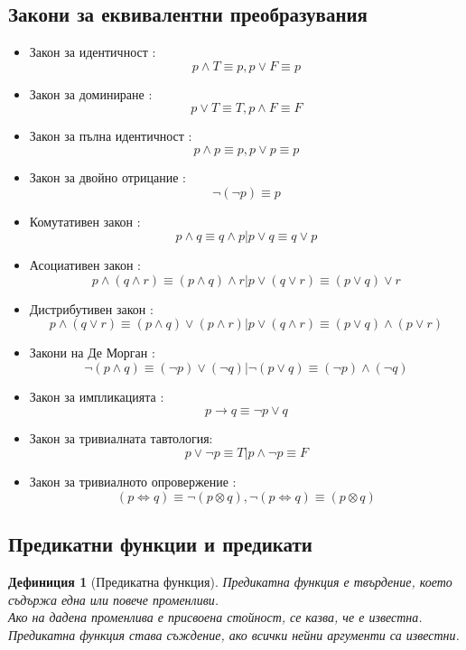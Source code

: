 \documentclass[fleqn, 12pt]{article}
\newtheorem{definition}{Дефиниция}[subsection]
\begin{document}
\newpage

\subsection{Закони за еквивалентни преобразувания}

\begin{itemize}
	\item Закон за идентичност : $$p \land T \equiv p , p \lor F \equiv p$$
	\item Закон за доминиране : $$p \lor T \equiv T , p \land F \equiv F$$
	\item Закон за пълна идентичност : $$p \land p \equiv p , p \lor p \equiv p$$
	\item Закон за двойно отрицание : $$\neg(\neg p) \equiv p $$
	\item Комутативен закон : $$p \land q \equiv q \land p | p \lor q \equiv q \lor p$$
	\item Асоциативен закон : $$p \land (q \land r) \equiv (p \land q ) \land r | p \lor (q \lor r) \equiv (p \lor q ) \lor r$$
	\item Дистрибутивен закон : $$p \land (q \lor r) \equiv (p \land q ) \lor (p \land r ) | p \lor (q \land r) \equiv (p \lor q ) \land (p \lor r )  $$
	\item Закони на Де Морган : $$\neg (p \land q) \equiv (\neg p) \lor (\neg q) | \neg (p \lor q) \equiv (\neg p) \land (\neg q) $$
	\item Закон за импликацията : $$p \rightarrow q \equiv \neg p \lor q$$
	\item Закон за тривиалната тавтология:  $$p \lor \neg p \equiv T | p \land \neg p \equiv F$$
	\item Закон за тривиалното опровержение : $$(p \Leftrightarrow q) \equiv \neg (p \otimes q), \neg (p \Leftrightarrow q) \equiv (p \otimes q) $$
\end{itemize}

\subsection{Предикатни функции и предикати}

\begin{definition}[Предикатна функция]
Предикатна функция е твърдение, което съдържа една или повече променливи. \\
Ако на дадена променлива е присвоена стойност, се казва, че е известна.\\
Предикатна функция става съждение, ако всички нейни аргументи са известни. \\
\end{definition}
\end{document}
